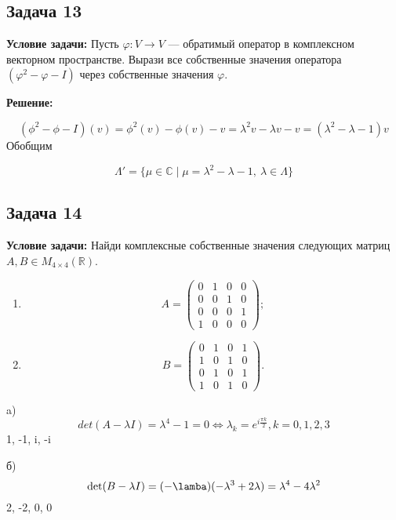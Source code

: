\documentclass[a4paper,12pt]{article}
\begin{document}
\subsection{Задача 13}
\textbf{Условие задачи:} Пусть $\varphi: V \to V$ — обратимый оператор в комплексном векторном пространстве. Вырази все собственные значения оператора $(\varphi^2 - \varphi - I)$ через собственные значения $\varphi$.

\textbf{Решение: }

\[
(\phi^2-\phi-I)(v) = \phi^2(v)-\phi(v)-v=\lambda^2v-\lambda v - v = (\lambda^2 - \lambda - 1)v
\]
Обобщим

\[
\Lambda' = \{ \mu \in \mathbb{C} \mid \mu = \lambda^2 - \lambda - 1, \ \lambda \in \Lambda \}
\]

\subsection{Задача 14}
\textbf{Условие задачи:} Найди комплексные собственные значения следующих матриц $A, B \in M_{4 \times 4}(\mathbb{R})$.
\begin{enumerate}
    \item 
    \[
    A =
    \begin{pmatrix}
    0 & 1 & 0 & 0 \\
    0 & 0 & 1 & 0 \\
    0 & 0 & 0 & 1 \\
    1 & 0 & 0 & 0
    \end{pmatrix};
    \]
    \item 
    \[
    B =
    \begin{pmatrix}
    0 & 1 & 0 & 1 \\
    1 & 0 & 1 & 0 \\
    0 & 1 & 0 & 1 \\
    1 & 0 & 1 & 0
    \end{pmatrix}.
    \]
\end{enumerate}
a) 
\[
det(A-\lambda I) = \lambda^4 - 1 = 0 \Leftrightarrow \lambda_k = e^{i\frac{\pi k}{2}}, k = 0, 1, 2, 3
\]
1, -1, i, -i

б)
\[
\det(B-\lambda I) = (-\lamba)(-\lambda^3+2\lambda) = \lambda^4-4\lambda^2
\]
2, -2, 0, 0
\end{document}

